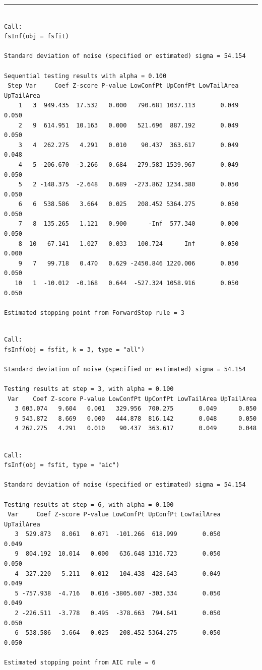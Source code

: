 \documentclass[
  letterpaper,
  DIV=11,
  numbers=noendperiod]{scrartcl}
\begin{document}
\begin{center}\rule{0.5\linewidth}{0.5pt}\end{center}

\begin{verbatim}

Call:
fsInf(obj = fsfit)

Standard deviation of noise (specified or estimated) sigma = 54.154

Sequential testing results with alpha = 0.100
 Step Var     Coef Z-score P-value LowConfPt UpConfPt LowTailArea UpTailArea
    1   3  949.435  17.532   0.000   790.681 1037.113       0.049      0.050
    2   9  614.951  10.163   0.000   521.696  887.192       0.049      0.050
    3   4  262.275   4.291   0.010    90.437  363.617       0.049      0.048
    4   5 -206.670  -3.266   0.684  -279.583 1539.967       0.049      0.050
    5   2 -148.375  -2.648   0.689  -273.862 1234.380       0.050      0.050
    6   6  538.586   3.664   0.025   208.452 5364.275       0.050      0.050
    7   8  135.265   1.121   0.900      -Inf  577.340       0.000      0.050
    8  10   67.141   1.027   0.033   100.724      Inf       0.050      0.000
    9   7   99.718   0.470   0.629 -2450.846 1220.006       0.050      0.050
   10   1  -10.012  -0.168   0.644  -527.324 1058.916       0.050      0.050

Estimated stopping point from ForwardStop rule = 3
\end{verbatim}

\begin{verbatim}

Call:
fsInf(obj = fsfit, k = 3, type = "all")

Standard deviation of noise (specified or estimated) sigma = 54.154

Testing results at step = 3, with alpha = 0.100
 Var    Coef Z-score P-value LowConfPt UpConfPt LowTailArea UpTailArea
   3 603.074   9.604   0.001   329.956  700.275       0.049      0.050
   9 543.872   8.669   0.000   444.878  816.142       0.048      0.050
   4 262.275   4.291   0.010    90.437  363.617       0.049      0.048
\end{verbatim}

\begin{verbatim}

Call:
fsInf(obj = fsfit, type = "aic")

Standard deviation of noise (specified or estimated) sigma = 54.154

Testing results at step = 6, with alpha = 0.100
 Var     Coef Z-score P-value LowConfPt UpConfPt LowTailArea UpTailArea
   3  529.873   8.061   0.071  -101.266  618.999       0.050      0.049
   9  804.192  10.014   0.000   636.648 1316.723       0.050      0.050
   4  327.220   5.211   0.012   104.438  428.643       0.049      0.049
   5 -757.938  -4.716   0.016 -3805.607 -303.334       0.050      0.049
   2 -226.511  -3.778   0.495  -378.663  794.641       0.050      0.050
   6  538.586   3.664   0.025   208.452 5364.275       0.050      0.050

Estimated stopping point from AIC rule = 6
\end{verbatim}
\end{document}
